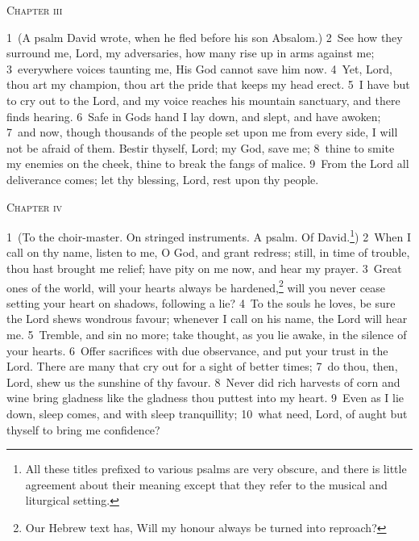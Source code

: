 \documentclass[10pt]{book} %
\begin{document}
\begin{large}\begin{center}\textsc{Chapter iii}\end{center}\end{large}
\textcolor{benred8}{1}~(A psalm David wrote, when he fled before his son Absalom.)
\textcolor{benred8}{2}~See how they surround me, Lord, my adversaries, how many rise up in arms against me; \textcolor{benred8}{3}~everywhere voices taunting me, His God cannot save him now. \textcolor{benred8}{4}~Yet, Lord, thou art my champion, thou art the pride that keeps my head erect. \textcolor{benred8}{5}~I have but to cry out to the Lord, and my voice reaches his mountain sanctuary, and there finds hearing. \textcolor{benred8}{6}~Safe in God\textquotesingle s hand I lay down, and slept, and have awoken; \textcolor{benred8}{7}~and now, though thousands of the people set upon me from every side, I will not be afraid of them. Bestir thyself, Lord; my God, save me; \textcolor{benred8}{8}~thine to smite my enemies on the cheek, thine to break the fangs of malice. \textcolor{benred8}{9}~From the Lord all deliverance comes; let thy blessing, Lord, rest upon thy people.
\begin{large}\begin{center}\textsc{Chapter iv}\end{center}\end{large}
\textcolor{benred8}{1}~(To the choir-master. On stringed instruments. A psalm. Of David.\footnote[1]{All these titles prefixed to various psalms are very obscure, and there is little agreement about their meaning except that they refer to the musical and liturgical setting.})
\textcolor{benred8}{2}~When I call on thy name, listen to me, O God, and grant redress; still, in time of trouble, thou hast brought me relief; have pity on me now, and hear my prayer. \textcolor{benred8}{3}~Great ones of the world, will your hearts always be hardened,\footnote[2]{Our Hebrew text has, \textasciigrave Will my honour always be turned into reproach?\textquotesingle } will you never cease setting your heart on shadows, following a lie? \textcolor{benred8}{4}~To the souls he loves, be sure the Lord shews wondrous favour; whenever I call on his name, the Lord will hear me. \textcolor{benred8}{5}~Tremble, and sin no more; take thought, as you lie awake, in the silence of your hearts. \textcolor{benred8}{6}~Offer sacrifices with due observance, and put your trust in the Lord. There are many that cry out for a sight of better times; \textcolor{benred8}{7}~do thou, then, Lord, shew us the sunshine of thy favour. \textcolor{benred8}{8}~Never did rich harvests of corn and wine bring gladness like the gladness thou puttest into my heart. \textcolor{benred8}{9}~Even as I lie down, sleep comes, and with sleep tranquillity; \textcolor{benred8}{10}~what need, Lord, of aught but thyself to bring me confidence?
\end{document}
